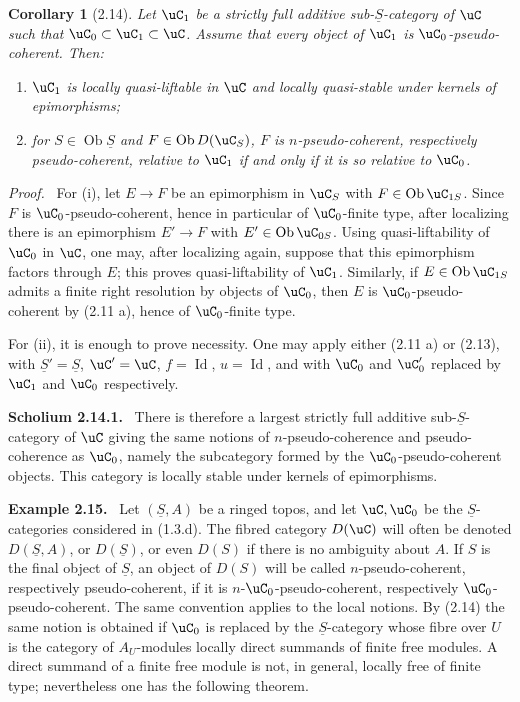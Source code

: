 \documentclass[11pt]{article}
\theoremstyle{plain}
\newtheorem*{corollary*}{Corollary}
\theoremstyle{definition}
\theoremstyle{remark}
\newenvironment{statement}[1]{\par\medskip\noindent\textbf{#1.}\ }{\par\medskip}
\newenvironment{prooftext}{\par\noindent\textit{Proof.}\ }{\par\medskip}
\DeclareMathOperator{\ob}{Ob}
\providecommand{\uS}{\underline{S}}
\begin{document}
\begin{corollary*}[2.14]
Let $\uC_1$ be a strictly full additive sub-$\uS$-category of $\uC$ such that $\uC_0\subset\uC_1\subset\uC$. Assume that every object of $\uC_1$ is $\uC_0$-pseudo-coherent. Then:
\begin{enumerate}[label=(\roman*)]
\item $\uC_1$ is locally quasi-liftable in $\uC$ and locally quasi-stable under kernels of epimorphisms;
\item for $S\in\ob\uS$ and $F\in\ob D(\uC_S)$, $F$ is $n$-pseudo-coherent, respectively pseudo-coherent, relative to $\uC_1$ if and only if it is so relative to $\uC_0$.
\end{enumerate}
\end{corollary*}

\begin{prooftext}
For (i), let $E\to F$ be an epimorphism in $\uC_S$ with $F\in\ob\uC_{1S}$. Since $F$ is $\uC_0$-pseudo-coherent, hence in particular of $\uC_0$-finite type, after localizing there is an epimorphism $E'\to F$ with $E'\in\ob\uC_{0S}$. Using quasi-liftability of $\uC_0$ in $\uC$, one may, after localizing again, suppose that this epimorphism factors through $E$; this proves quasi-liftability of $\uC_1$. Similarly, if $E\in\ob\uC_{1S}$ admits a finite right resolution by objects of $\uC_0$, then $E$ is $\uC_0$-pseudo-coherent by (2.11 a), hence of $\uC_0$-finite type.

For (ii), it is enough to prove necessity. One may apply either (2.11 a) or (2.13), with $\uS'=\uS$, $\uC'=\uC$, $f=\operatorname{Id}$, $u=\operatorname{Id}$, and with $\uC_0$ and $\uC'_0$ replaced by $\uC_1$ and $\uC_0$ respectively.
\end{prooftext}

\begin{statement}{Scholium 2.14.1}
There is therefore a largest strictly full additive sub-$\uS$-category of $\uC$ giving the same notions of $n$-pseudo-coherence and pseudo-coherence as $\uC_0$, namely the subcategory formed by the $\uC_0$-pseudo-coherent objects. This category is locally stable under kernels of epimorphisms.
\end{statement}

\begin{statement}{Example 2.15}
Let $(\uS,A)$ be a ringed topos, and let $\uC,\uC_0$ be the $\uS$-categories considered in (1.3.d). The fibred category $D(\uC)$ will often be denoted $D(\uS,A)$, or $D(\uS)$, or even $D(S)$ if there is no ambiguity about $A$. If $S$ is the final object of $\uS$, an object of $D(S)$ will be called $n$-pseudo-coherent, respectively pseudo-coherent, if it is $n$-$\uC_0$-pseudo-coherent, respectively $\uC_0$-pseudo-coherent. The same convention applies to the local notions. By (2.14) the same notion is obtained if $\uC_0$ is replaced by the $\uS$-category whose fibre over $U$ is the category of $A_U$-modules locally direct summands of finite free modules. A direct summand of a finite free module is not, in general, locally free of finite type; nevertheless one has the following theorem.
\end{statement}
\end{document}
